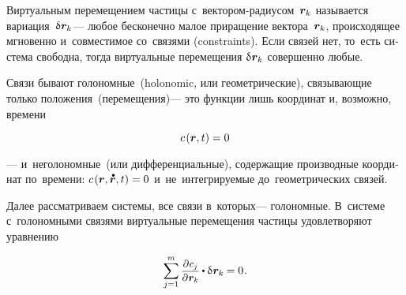 \begin{otherlanguage}{russian}

Виртуальным перемещением частицы с~вектором\hbox{-}радиусом~${\bm{r}_k}$ называется вариация~${\variation{\hspace{.1ex}\locationvector_k}}$\:---
любое бесконечно малое приращение вектора~${\bm{r}_k}$, происходящее мгновенно %
и~совместимое со~связями (constraints).
Если связей нет, то~есть система свободна, тогда виртуальные перемещения ${\variation{\hspace{.1ex}\locationvector_k}}$ совершенно любые.

Связи бывают голономные~(holonomic, или геометрические), связывающие только положения~(перемещения)\:--- это функции лишь координат и, возможно, времени

\nopagebreak\vspace{-0.1em}\begin{equation}\label{holonomicconstraint}
c\hspace{.2ex}(\bm{r}, t) = 0
\end{equation}

\vspace{-0.1em}\noindent
--- и~неголономные~(или дифференциальные), содержащие производные координат по~времени: ${c\hspace{.2ex}(\locationvector, \mathdotabove{\locationvector}, t) = 0}$ и~не~интегрируемые до~геометрических связей.

Далее рассматриваем системы, все связи в~которых\:--- голономные.
В~системе с~голономными связями виртуальные перемещения частицы  удовлетворяют уравнению

\nopagebreak\vspace{-0.1em}\begin{equation}\label{requirementforvirtualdisplacements}
\displaystyle \sum_{\smash{j=1}}^{m} \scalebox{.92}{$\displaystyle \frac{\raisemath{-0.12em}{\partial \hspace{.1ex} c_{j}}}{\partial \hspace{.1ex} \locationvector_k}$} \hspace{-0.1ex} \dotp \variation{\hspace{.1ex}\locationvector_k} \hspace{-0.1ex} = 0 \hspace{.16ex}.
\vspace{-0.25em}\end{equation}


\end{otherlanguage}
